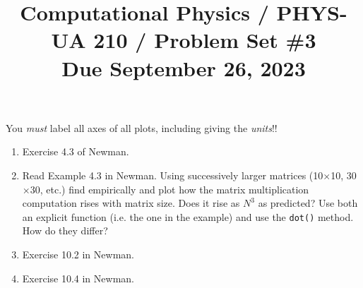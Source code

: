 \documentclass[11pt, preprint]{aastex}
\begin{document}
\title{\bf Computational Physics / PHYS-UA 210 / Problem Set \#3
\\ Due September 26, 2023}

You {\it must} label all axes of all plots, including giving the {\it
  units}!!

\begin{enumerate}
  \item Exercise 4.3 of Newman.

  \item Read Example 4.3 in Newman. Using successively larger matrices
    (10$\times$10, 30$\times$30, etc.) find empirically and plot how
    the matrix multiplication computation rises with matrix size. Does
    it rise as $N^3$ as predicted? Use both an explicit function
    (i.e. the one in the example) and use the {\tt dot()} method. How
    do they differ?

  \item Exercise 10.2 in Newman.
  \item Exercise 10.4 in Newman.

\end{enumerate}
\end{document}
